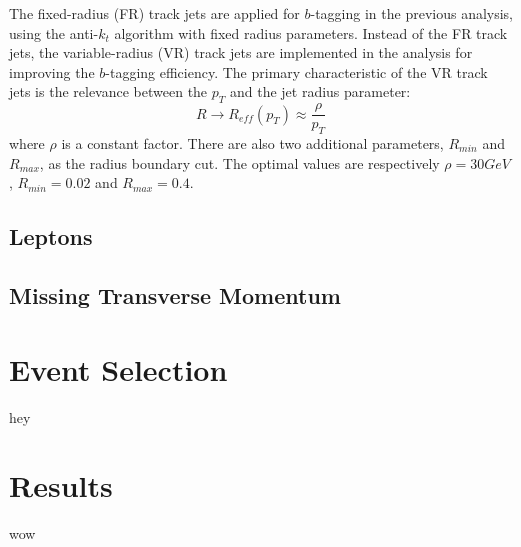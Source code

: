 \documentclass[class=NTHU_thesis, crop=false]{standalone}
\begin{document}
The fixed-radius (FR) track jets are applied for $b$-tagging in the previous analysis, using the anti-$k_t$ algorithm with fixed radius parameters. Instead of the FR track jets, the variable-radius (VR) track jets are implemented in the analysis for improving the $b$-tagging efficiency. The primary characteristic of the VR track jets is the relevance between the $p_T$ and the jet radius parameter: 
\begin{equation}
R \to R_{eff}(p_T) \approx \frac{\rho}{p_T}
\end{equation}
where $\rho$ is a constant factor. There are also two additional parameters, $R_{min}$ and $R_{max}$, as the radius boundary cut. The optimal values are respectively $\rho = 30 GeV$, $R_{min} = 0.02$ and $R_{max} = 0.4$.

\subsection{Leptons}

\subsection{Missing Transverse Momentum}


\section{Event Selection}
hey

\section{Results}
wow
\end{document}

